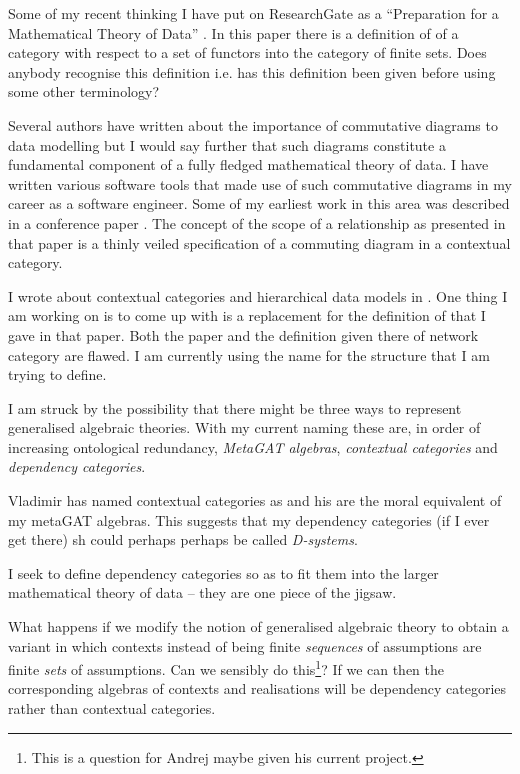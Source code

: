\documentclass[10pt,a4paper]{article}
\theoremstyle{remark}
\begin{document}
\note
Some of my recent thinking I have put on ResearchGate as a ``Preparation for a Mathematical Theory of Data''
\cite{CartmellPreparation}. In this paper there is a definition of  of a category with respect to a set of functors into the category of finite sets. Does anybody recognise this definition i.e. has this definition been given before using some other terminology? 

\note Several authors have written about the importance of commutative diagrams to data modelling but 
I would say further that such diagrams constitute a fundamental component of a fully fledged mathematical theory of data.
I have written various software tools that made  use of such commutative diagrams in my career as a software engineer. Some of my earliest work in this area was described in a conference paper  \cite{CartmellScopePaper}. 
The concept of the scope of a relationship as presented in that paper is a thinly veiled
specification of a commuting diagram in a contextual category.

\note
I wrote about contextual categories and hierarchical data models in \cite{CartmellNetworkDataModel}.
One thing I am working on is to come up with is a replacement for the definition 
 of  that I gave in that paper. Both the paper and the definition given there of network category are flawed.
I am currently using the name  for the structure that I am trying to define.

\note
I am struck by the possibility that there might be three ways to represent generalised algebraic theories.
With my current naming these are, in order of increasing ontological redundancy, \textit{MetaGAT algebras}, \textit{contextual categories} and
\textit{dependency categories}. 

\note
Vladimir has named contextual categories as  and his  are the moral equivalent of my metaGAT algebras. This suggests that my dependency categories (if I ever get there) sh
could perhaps perhaps be called \textit{D-systems}.

\note I seek to define dependency categories so as to fit them into the larger mathematical theory of data -- they are one piece of the jigsaw.

\note What happens if we modify the notion of generalised algebraic theory to obtain a variant in which contexts instead of being finite \textit{sequences} of assumptions are finite \textit{sets} of assumptions. Can we sensibly do this\footnote{This is a question for Andrej maybe given his current project.}? If we can then the corresponding algebras of contexts and realisations will be dependency categories rather than contextual categories.
\end{document}
